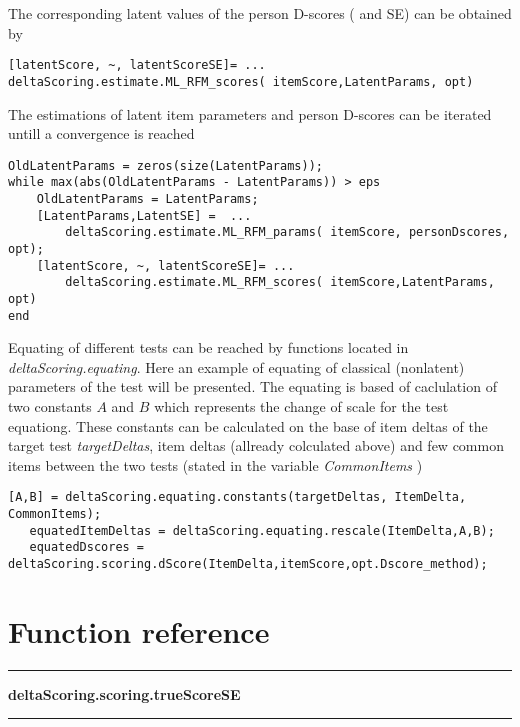\documentclass[12pt]{article}
\begin{document}
The corresponding latent values of the person D-scores ( and SE) can be obtained by
\begin{lstlisting}[style=Matlab-bw]
[latentScore, ~, latentScoreSE]= ...
deltaScoring.estimate.ML_RFM_scores( itemScore,LatentParams, opt)
\end{lstlisting}

The estimations of latent item parameters and person D-scores can be iterated untill a convergence is reached

\begin{lstlisting}[style=Matlab-bw]
OldLatentParams = zeros(size(LatentParams));
while max(abs(OldLatentParams - LatentParams)) > eps
	OldLatentParams = LatentParams;
	[LatentParams,LatentSE] =  ...
		deltaScoring.estimate.ML_RFM_params( itemScore, personDscores, opt);
	[latentScore, ~, latentScoreSE]= ...
		deltaScoring.estimate.ML_RFM_scores( itemScore,LatentParams, opt)
end
\end{lstlisting}

Equating of different tests can be reached by functions located in {\itshape deltaScoring.equating}. Here an example of equating of classical (nonlatent) parameters of the test will be presented. The equating is based of caclulation of two constants $A$ and $B$ which represents the change of scale for the test equationg. These constants can be calculated on the base of  item deltas of the target test {\itshape  targetDeltas}, item deltas (allready colculated above) and few common items between the two tests (stated in the variable {\itshape CommonItems} )

\begin{lstlisting}[style=Matlab-bw]
   [A,B] = deltaScoring.equating.constants(targetDeltas, ItemDelta, CommonItems);
   equatedItemDeltas = deltaScoring.equating.rescale(ItemDelta,A,B);
   equatedDscores = deltaScoring.scoring.dScore(ItemDelta,itemScore,opt.Dscore_method);
\end{lstlisting}


\section{Function reference}

\par\noindent\rule{\textwidth}{0.4pt}
{\bf deltaScoring.scoring.trueScoreSE}
\par\noindent\rule{\textwidth}{0.4pt}
\end{document}
